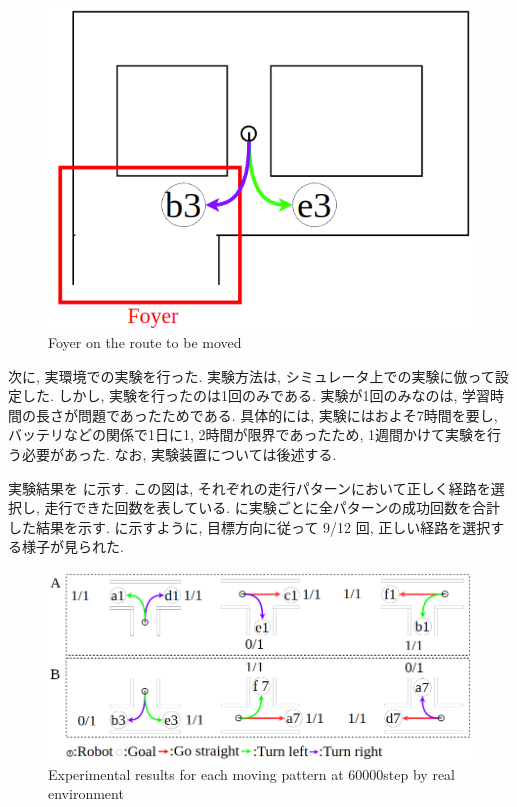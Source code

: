 \begin{figure}[hbtp]
  \centering
 \includegraphics[keepaspectratio, scale=0.4]
      {images/howaie2.png}
 \caption{Foyer on the route to be moved}
 \label{Fig:howaie}
\end{figure}

次に, 実環境での実験を行った. 実験方法は, シミュレータ上での実験に倣って設定した. しかし, 実験を行ったのは1回のみである. 実験が1回のみなのは, 学習時間の長さが問題であったためである. 具体的には, 実験にはおよそ7時間を要し, バッテリなどの関係で1日に1, 2時間が限界であったため, 1週間かけて実験を行う必要があった. なお, 実験装置については後述する.

実験結果を  に示す. この図は, それぞれの走行パターンにおいて正しく経路を選択し, 走行できた回数を表している.  に実験ごとに全パターンの成功回数を合計した結果を示す.  に示すように, 目標方向に従って 9/12 回, 正しい経路を選択する様子が見られた.

\begin{figure}[hbtp]
  \centering
 \includegraphics[keepaspectratio, scale=0.4]
      {images/60000step_real2.png}
 \caption{Experimental results for each moving pattern at 60000step by real environment}
 \label{Fig:60000step_real}
\end{figure}

